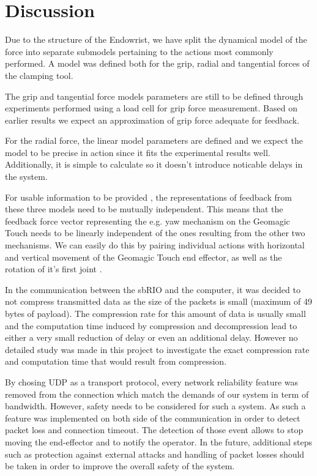 \section{Discussion}
Due to the structure of the Endowrist, we have split the dynamical model of the force into separate submodels pertaining to the actions most commonly performed.
A model was defined both for the grip, radial and tangential forces of the clamping tool.

The grip and tangential force models parameters are still to be defined through experiments performed using a load cell for grip force measurement.
Based on earlier results \cite{kim2014dynamic} we expect an approximation of grip force adequate for feedback.

For the radial force, the linear model parameters are defined and we expect the model to be precise in action since it fits the experimental results well.
Additionally, it is simple to calculate so it doesn't introduce noticable delays in the system.

For usable information to be provided , the representations of feedback from these three models need to be mutually independent.
This means that the feedback force vector representing the e.g. yaw mechanism on the Geomagic Touch needs to be linearly independent of the ones resulting from the other two mechanisms. 
We can easily do this by pairing individual actions with horizontal and vertical movement of the Geomagic Touch end effector, as well as the rotation of it's first joint .

In the communication between the sbRIO and the computer, it was decided to not compress transmitted data as the size of the packets is small (maximum of 49 bytes of payload). The compression rate for this amount of data is usually small and the computation time induced by compression and decompression lead to either a very small reduction of delay or even an additional delay. However no detailed study was made in this project to investigate the exact compression rate and computation time that would result from compression.

By chosing UDP as a transport protocol, every network reliability feature was removed from the connection which match the demands of our system in term of bandwidth. 
However, safety needs to be considered for such a system. 
As such a feature was implemented on both side of the communication in order to detect packet loss and connection timeout. 
The detection of those event allows to stop moving the end-effector and to notify the operator. 
In the future, additional steps such as protection against external attacks and handling of packet losses should be taken in order to improve the overall safety of the system.
